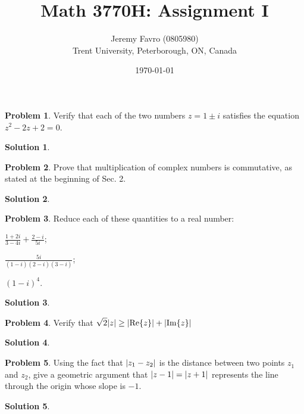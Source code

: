 \documentclass[10pt]{article}
\title{Math 3770H: Assignment I}
\author{Jeremy Favro (0805980) \\ Trent University, Peterborough, ON, Canada}
\date{\today}
\theoremstyle{definition}
\newtheorem{problem}{Problem}
\newtheorem{soln}{Solution}
\begin{document}
\maketitle

\begin{problem}
Verify that each of the two numbers $z = 1 \pm i$ satisfies the equation $z^2 - 2z + 2 = 0$.
\end{problem}
\begin{soln}
\end{soln}

\begin{problem}
Prove that multiplication of complex numbers is commutative, as stated at the beginning
of Sec. 2.
\end{problem}
\begin{soln}
\end{soln}

\begin{problem}
Reduce each of these quantities to a real number:\\
\begin{center}
  \begin{enumerate*}[label=(\alph*)]
    \item $\displaystyle\frac{1+2i}{3-4i}+\frac{2-i}{5i}$;\qquad~
    \item $\displaystyle\frac{5i}{(1-i)(2-i)(3-i)}$;\qquad~
    \item $\displaystyle(1-i)^4$.
  \end{enumerate*}
\end{center}
\end{problem}
\begin{soln}
\end{soln}

\begin{problem}
Verify that $\displaystyle\sqrt{2}\abs{z}\geq \abs{\Re{z}} +\abs{\Im{z}}$
\end{problem}
\begin{soln}
\end{soln}

\begin{problem}
Using the fact that $\abs{z_1-z_2}$ is the distance between two points $z_1$ and $z_2$, give a geometric
argument that $\abs{z-1}=\abs{z+1}$ represents the line through the origin whose slope is $-1$.
\end{problem}
\begin{soln}
\end{soln}
\end{document}
